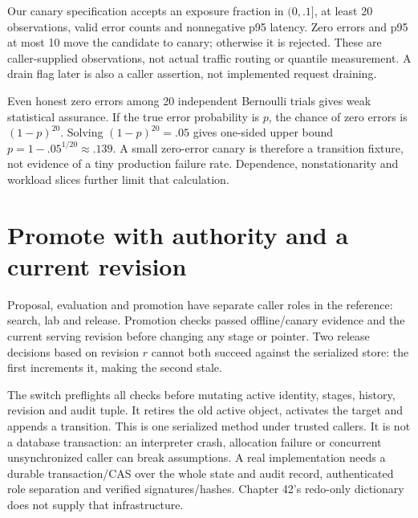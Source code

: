 Our canary specification accepts an exposure fraction in $(0,.1]$, at least
20 observations, valid error counts and nonnegative p95 latency. Zero errors
and p95 at most 10 move the candidate to canary; otherwise it is rejected.
These are caller-supplied observations, not actual traffic routing or quantile
measurement. A drain flag later is also a caller assertion, not implemented
request draining.

Even honest zero errors among 20 independent Bernoulli trials gives weak
statistical assurance. If the true error probability is $p$, the chance of
zero errors is $(1-p)^{20}$. Solving $(1-p)^{20}=.05$ gives one-sided upper
bound $p=1-.05^{1/20}\approx .139$. A small zero-error canary is therefore a
transition fixture, not evidence of a tiny production failure rate. Dependence,
nonstationarity and workload slices further limit that calculation.

\section{Promote with authority and a current revision}
\label{evod43:promotion}
Proposal, evaluation and promotion have separate caller roles in the reference:
search, lab and release. Promotion checks passed offline/canary evidence and
the current serving revision before changing any stage or pointer. Two
release decisions based on revision $r$ cannot both succeed against the
serialized store: the first increments it, making the second stale.

The switch preflights all checks before mutating active identity, stages,
history, revision and audit tuple. It retires the old active object, activates
the target and appends a transition. This is one serialized method under
trusted callers. It is not a database transaction: an interpreter crash,
allocation failure or concurrent unsynchronized caller can break assumptions.
A real implementation needs a durable transaction/CAS over the whole state
and audit record, authenticated role separation and verified signatures/hashes.
Chapter 42's redo-only dictionary does not supply that infrastructure.

